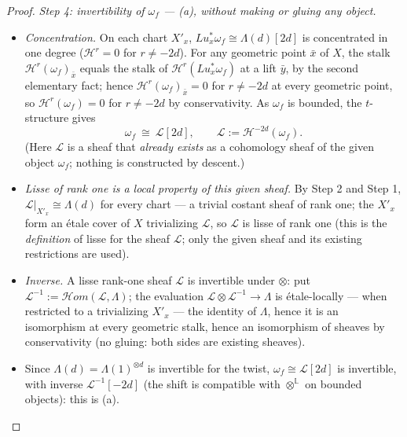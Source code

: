 \documentclass[11pt]{article}
\theoremstyle{plain}
\theoremstyle{definition}
\begin{document}
\begin{proof}
\emph{Step 4: invertibility of $\omega_f$ --- (a), without making
or gluing any object.}
\begin{itemize}
\item[(4a)] \emph{Concentration.}  On each chart $X'_x$,
$Lu_x^{*}\omega_f\cong\Lambda(d)[2d]$ is concentrated in one degree
($\mathcal H^r=0$ for $r\neq-2d$).  For any geometric point $\bar x$
of $X$, the stalk $\mathcal H^r(\omega_f)_{\bar x}$ equals the
stalk of $\mathcal H^r(Lu_x^{*}\omega_f)$ at a lift $\bar y$, by the
second elementary fact;  hence
$\mathcal H^r(\omega_f)_{\bar x}=0$ for $r\neq-2d$ at every
geometric point, so $\mathcal H^r(\omega_f)=0$ for $r\neq-2d$ by
conservativity.  As $\omega_f$ is bounded, the $t$-structure gives
\[
\omega_f\ \cong\ \mathcal L[2d],\qquad
\mathcal L:=\mathcal H^{-2d}(\omega_f).
\]
(Here $\mathcal L$ is a sheaf that \emph{already exists} as a
cohomology sheaf of the given object $\omega_f$;  nothing is
constructed by descent.)
\item[(4b)] \emph{Lisse of rank one is a local property of this
given sheaf.}  By Step 2 and Step 1,
$\mathcal L|_{X'_x}\cong\Lambda(d)$ for every chart --- a trivial
costant sheaf of rank one;  the $X'_x$ form an \'etale cover of $X$
trivializing $\mathcal L$, so $\mathcal L$ is lisse of rank one
(this is the \emph{definition} of lisse for the sheaf $\mathcal L$;
only the given sheaf and its existing restrictions are used).
\item[(4c)] \emph{Inverse.}  A lisse rank-one sheaf $\mathcal L$ is
invertible under $\otimes$:  put
$\mathcal L^{-1}:=\mathcal H\!om(\mathcal L,\Lambda)$;  the
evaluation $\mathcal L\otimes\mathcal L^{-1}\to\Lambda$ is
\'etale-locally --- when restricted to a trivializing $X'_x$ --- the
identity of $\Lambda$, hence it is an isomorphism at every geometric
stalk, hence an isomorphism of sheaves by conservativity (no gluing:
both sides are existing sheaves).
\item[(4d)] Since $\Lambda(d)=\Lambda(1)^{\otimes d}$ is invertible
for the twist, $\omega_f\cong\mathcal L[2d]$ is invertible, with
inverse $\mathcal L^{-1}[-2d]$ (the shift is compatible with
$\otimes^{\mathbb L}$ on bounded objects):  this is (a).
\end{itemize}


\end{proof}
\end{document}
